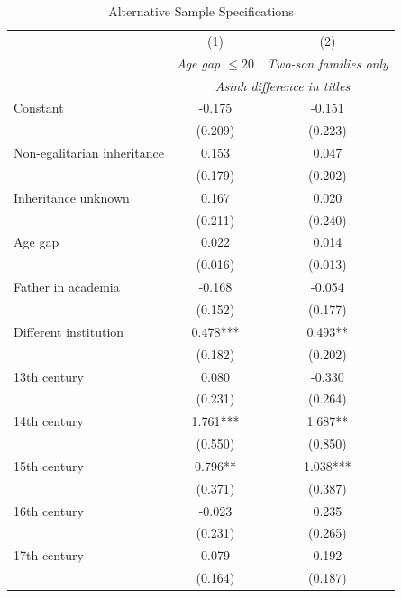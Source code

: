 \begin{table}[H]
\centering
\caption{Alternative Sample Specifications}
\label{tab:robustness}

\begin{tablebody}
\begin{tabular}{l c c}
\toprule
 & (1) & (2) \\
 & \textit{Age gap $\leq 20$} & \textit{Two-son families only} \\
\midrule
 & \multicolumn{2}{c}{\textit{Asinh difference in titles}} \\
\midrule

Constant
& -0.175
& -0.151 \\
& (0.209)
& (0.223) \\

Non-egalitarian inheritance
& 0.153
& 0.047 \\
& (0.179)
& (0.202) \\

Inheritance unknown
& 0.167
& 0.020 \\
& (0.211)
& (0.240) \\

Age gap
& 0.022
& 0.014 \\
& (0.016)
& (0.013) \\

Father in academia
& -0.168
& -0.054 \\
& (0.152)
& (0.177) \\

Different institution
& 0.478*** 
& 0.493** \\
& (0.182)
& (0.202) \\

13th century
& 0.080
& -0.330 \\
& (0.231)
& (0.264) \\

14th century
& 1.761*** 
& 1.687** \\
& (0.550)
& (0.850) \\

15th century
& 0.796** 
& 1.038*** \\
& (0.371)
& (0.387) \\

16th century
& -0.023
& 0.235 \\
& (0.231)
& (0.265) \\

17th century
& 0.079
& 0.192 \\
& (0.164)
& (0.187) \\


\end{tabular}
\end{tablebody}
\end{table}
